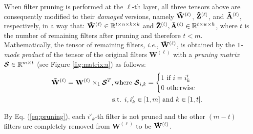 When filter pruning is performed at the $\ell$-th layer, all three tensors above are consequently modified to their \textit{damaged} versions, namely $\mathbf{\Tilde{W}}^{(\ell)}$, $\mathbf{\Tilde{Z}}^{(\ell)}$, and $\mathbf{\Tilde{A}}^{(\ell)}$, respectively, in a way that: $\mathbf{\Tilde{W}}^{(\ell)} \in \mathbb{R}^{t \times n \times k \times k}$ and $\mathbf{\Tilde{Z}}^{(\ell)},\mathbf{\Tilde{A}}^{(\ell)} \in \mathbb{R}^{t \times w \times h}$, where $t$ is the number of remaining filters after pruning and therefore $t < m$. Mathematically, the tensor of remaining filters, \textit{i.e.}, $\mathbf{\Tilde{W}}^{(\ell)}$, is obtained by the \textit{$1$-mode product} \cite{DBLP:journals/siamrev/KoldaB09} of the tensor of the original filters $\mathbf{W}^{(\ell)}$ with a \textit{pruning matrix} $\boldsymbol{\S} \in \mathbb{R}^{m \times t}$ (see Figure \ref{fig:matrix:a})
as follows:
\begin{eqnarray}\begin{split}\label{eq:pruning}
\mathbf{\Tilde{W}}^{(\ell)} = {\mathbf{W}}^{(\ell)} \times_{1} {\boldsymbol{\S}}^{T},\text{where }\boldsymbol{\S}_{i,k} = 
  \begin{cases} 
   1~ \text{if } i = i'_k \\
   0~ \text{otherwise}
  \end{cases} \\
  \text{s.t. } i, i'_k \in [1, m] 
  \text{ and } k \in [1, t].
  \end{split}
\end{eqnarray}
  
By Eq. (\ref{eq:pruning}), each $i'_k$-th filter is not pruned and the other $(m-t)$ filters are completely removed from $\mathbf{W}^{(\ell)}$ to be $\mathbf{\Tilde{W}}^{(\ell)}$.

